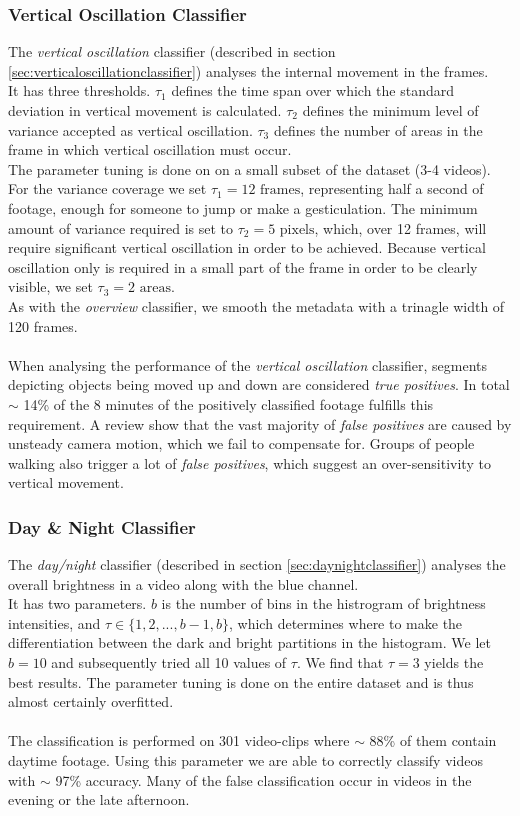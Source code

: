 \subsubsection{Vertical Oscillation Classifier}
%
The \textit{vertical oscillation} classifier (described in section \ref{sec:verticaloscillationclassifier}) analyses the internal movement in the frames.\\
It has three thresholds. $\tau_1$ defines the time span over which the standard deviation in vertical movement is calculated. $\tau_2$ defines the minimum level of variance accepted as vertical oscillation. $\tau_3$ defines the number of areas in the frame in which vertical oscillation must occur.\\
The parameter tuning is done on on a small subset of the dataset (3-4 videos). For the variance coverage we set $\tau_1 = 12 \text{ frames}$, representing half a second of footage, enough for someone to jump or make a gesticulation. The minimum amount of variance required is set to $\tau_2 = 5 \text{ pixels}$, which, over 12 frames, will require significant vertical oscillation in order to be achieved. Because vertical oscillation only is required in a small part of the frame in order to be clearly visible, we set $\tau_3 = 2 \text{ areas}$.\\
As with the \textit{overview} classifier, we smooth the metadata with a trinagle width of 120 frames.\\
\\
When analysing the performance of the \textit{vertical oscillation} classifier, segments depicting objects being moved up and down are considered \textit{true positives}. In total $\sim$ 14\% of the 8 minutes of the positively classified footage fulfills this requirement. A review show that the vast majority of \textit{false positives} are caused by unsteady camera motion, which we fail to compensate for. Groups of people walking also trigger a lot of \textit{false positives}, which suggest an over-sensitivity to vertical movement.
%
\subsubsection{Day \& Night Classifier}
%
The \textit{day/night} classifier (described in section \ref{sec:daynightclassifier}) analyses the overall brightness in a video along with the blue channel.\\
It has two parameters. $b$ is the number of bins in the histrogram of brightness intensities, and $\tau \in \{1,2,...,b-1,b\}$, which determines where to make the differentiation between the dark and bright partitions in the histogram. We let $b = 10$ and subsequently tried all 10 values of $\tau$. We find that $\tau = 3$ yields the best results. The parameter tuning is done on the entire dataset and is thus almost certainly overfitted.\\
\\
The classification is performed on 301 video-clips where $\sim$ 88\% of them contain daytime footage. Using this parameter we are able to correctly classify videos with $\sim$ 97\% accuracy. Many of the false classification occur in videos in the evening or the late afternoon.
%
